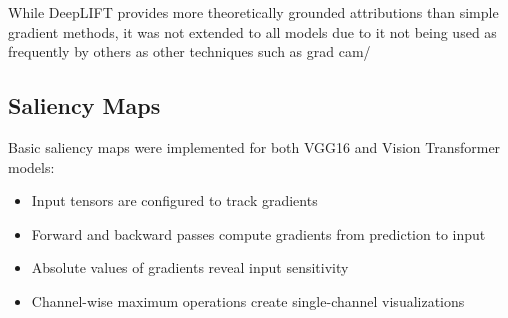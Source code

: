\documentclass[a4paper,12pt]{report}
\begin{document}
While DeepLIFT provides more theoretically grounded attributions than simple gradient methods, it was not extended to all models due to it not being used as frequently by others as other techniques such as grad cam/
\subsection{Saliency Maps}

Basic saliency maps were implemented for both VGG16 and Vision Transformer models:

\begin{itemize}
    \item Input tensors are configured to track gradients
    \item Forward and backward passes compute gradients from prediction to input
    \item Absolute values of gradients reveal input sensitivity
    \item Channel-wise maximum operations create single-channel visualizations
\end{itemize}






\end{document}

